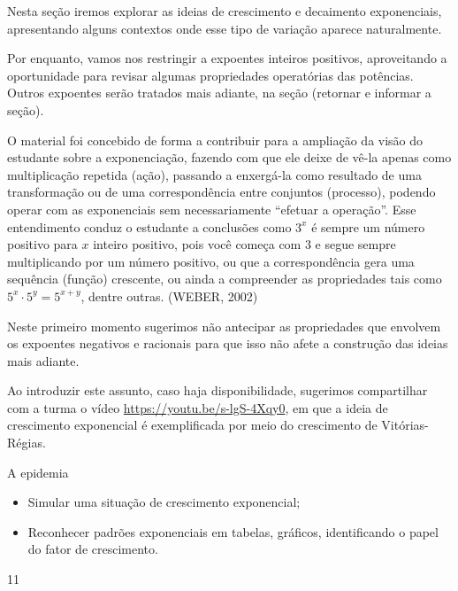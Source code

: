 \clearpage
\def\currentcolor{session1}
\begin{texto}
{	
	Nesta seção iremos explorar as ideias de crescimento e decaimento exponenciais, apresentando alguns contextos onde esse tipo de variação aparece naturalmente.

	Por enquanto, vamos nos restringir a expoentes inteiros positivos, aproveitando a oportunidade para revisar algumas propriedades operatórias das potências. Outros expoentes serão tratados mais adiante, na seção (retornar e informar a seção).

	O material foi concebido de forma a contribuir para a ampliação da visão do estudante sobre a exponenciação, fazendo com que ele deixe de vê-la apenas como multiplicação repetida (ação), passando a enxergá-la como resultado de uma transformação ou de uma correspondência entre conjuntos (processo), podendo operar com as exponenciais sem necessariamente “efetuar a operação”. Esse entendimento conduz o estudante a conclusões como $3^{x}$ é sempre um número positivo para $x$ inteiro positivo, pois você começa com $3$ e segue sempre multiplicando por um número positivo, ou que a correspondência gera uma sequência (função) crescente, ou ainda a compreender as propriedades tais como $5^{x} \cdot 5^{y} = 5^{x+y}$, dentre outras. (WEBER, 2002)

	Neste primeiro momento sugerimos não antecipar as propriedades que envolvem os expoentes negativos e racionais para que isso não afete a construção das ideias mais adiante.

	Ao introduzir este assunto, caso haja disponibilidade, sugerimos compartilhar com a turma o vídeo \url{https://youtu.be/s-lgS-4Xqy0}, em que a ideia de crescimento exponencial é exemplificada por meio do crescimento de Vitórias-Régias.
}
\end{texto}
\begin{objectives}{A epidemia}
{
	\begin{itemize}
	\item Simular uma situação de crescimento exponencial;
	\item Reconhecer padrões exponenciais em tabelas, gráficos, identificando o papel do fator de crescimento.
	\end{itemize}
}{1}{1}
\end{objectives}
\clearmargin
